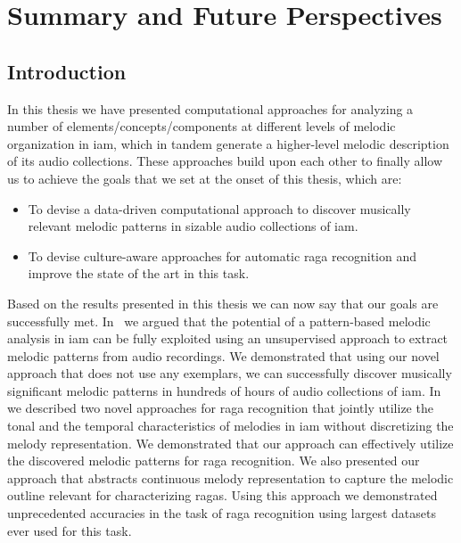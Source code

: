 
\chapter{Summary and Future Perspectives}
\label{chap:summary_future_work}

\section{Introduction}
\label{sec:summary_thesis}

In this thesis we have presented computational approaches for analyzing a number of elements/concepts/components at different levels of melodic organization in \gls{iam}, which in tandem generate a higher-level melodic description of its audio collections. These approaches build upon each other to finally allow us to achieve the goals that we set at the onset of this thesis, which are: 

\begin{itemize}
	\item To devise a data-driven computational approach to discover musically relevant melodic patterns in sizable audio collections of \gls{iam}.
	\item To devise culture-aware approaches for automatic \gls{raga} recognition and improve the state of the art in this task. 
\end{itemize}

Based on the results presented in this thesis we can now say that our goals are successfully met. In~ we argued that the potential of a pattern-based melodic analysis in \gls{iam} can be fully exploited using an unsupervised approach to extract melodic patterns from audio recordings. We demonstrated that using our novel approach that does not use any exemplars, we can successfully discover musically significant melodic patterns in hundreds of hours of audio collections of \gls{iam}. In~ we described two novel approaches for \gls{raga} recognition that jointly utilize the tonal and the temporal characteristics of melodies in \gls{iam} without discretizing the melody representation. We demonstrated that our approach can effectively utilize the discovered melodic patterns for \gls{raga} recognition. We also presented our approach that abstracts continuous melody representation to capture the melodic outline relevant for characterizing \glspl{raga}. Using this approach we demonstrated unprecedented accuracies in the task of \gls{raga} recognition using largest datasets ever used for this task. 

